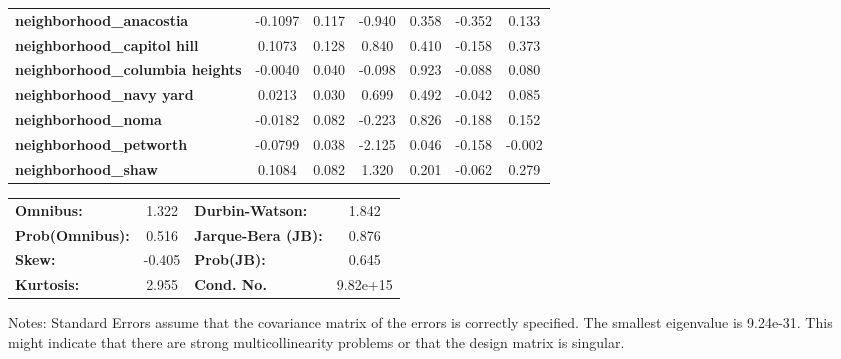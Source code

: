 \begin{center}
\begin{tabular}{lcccccc}
\textbf{neighborhood\_anacostia}        &      -0.1097  &        0.117     &    -0.940  &         0.358        &       -0.352    &        0.133     \\
\textbf{neighborhood\_capitol hill}     &       0.1073  &        0.128     &     0.840  &         0.410        &       -0.158    &        0.373     \\
\textbf{neighborhood\_columbia heights} &      -0.0040  &        0.040     &    -0.098  &         0.923        &       -0.088    &        0.080     \\
\textbf{neighborhood\_navy yard}        &       0.0213  &        0.030     &     0.699  &         0.492        &       -0.042    &        0.085     \\
\textbf{neighborhood\_noma}             &      -0.0182  &        0.082     &    -0.223  &         0.826        &       -0.188    &        0.152     \\
\textbf{neighborhood\_petworth}         &      -0.0799  &        0.038     &    -2.125  &         0.046        &       -0.158    &       -0.002     \\
\textbf{neighborhood\_shaw}             &       0.1084  &        0.082     &     1.320  &         0.201        &       -0.062    &        0.279     \\
\bottomrule
\end{tabular}
\begin{tabular}{lclc}
\textbf{Omnibus:}       &  1.322 & \textbf{  Durbin-Watson:     } &    1.842  \\
\textbf{Prob(Omnibus):} &  0.516 & \textbf{  Jarque-Bera (JB):  } &    0.876  \\
\textbf{Skew:}          & -0.405 & \textbf{  Prob(JB):          } &    0.645  \\
\textbf{Kurtosis:}      &  2.955 & \textbf{  Cond. No.          } & 9.82e+15  \\
\bottomrule
\end{tabular}
\end{center}

Notes: \newline
 [1] Standard Errors assume that the covariance matrix of the errors is correctly specified. \newline
 [2] The smallest eigenvalue is 9.24e-31. This might indicate that there are \newline
 strong multicollinearity problems or that the design matrix is singular.